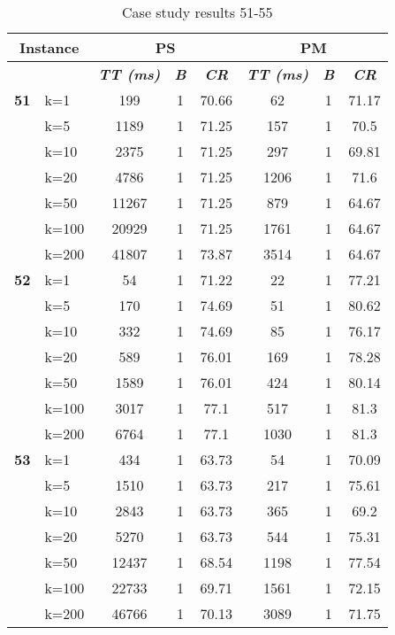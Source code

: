     \begin{table}[htbp]
    \caption{Case study results 51-55}
    \centering
    \begin{tabular}{|l|l|c|c|c|c|c|c|}
    \hline
    \multicolumn{ 2}{|c|}{\textbf{Instance}} & \multicolumn{ 3}{c|}{\textbf{PS}} & \multicolumn{ 3}{c|}{\textbf{PM}} \\ \hline
    \multicolumn{ 2}{|l|}{} & \textbf{\textit{TT (ms)}} & \textbf{\textit{B}} & \textbf{\textit{CR}} & \textbf{\textit{TT (ms)}} & \textbf{\textit{B}} & \textbf{\textit{CR}} \\ \hline
    \multicolumn{1}{|r|}{\textbf{51}} & k=1 & 199 & 1 & 70.66 & 62 & 1 & 71.17 \\ 
     & k=5 & 1189 & 1 & 71.25 & 157 & 1 & 70.5 \\ 
     & k=10 & 2375 & 1 & 71.25 & 297 & 1 & 69.81 \\ 
     & k=20 & 4786 & 1 & 71.25 & 1206 & 1 & 71.6 \\ 
     & k=50 & 11267 & 1 & 71.25 & 879 & 1 & 64.67 \\ 
     & k=100 & 20929 & 1 & 71.25 & 1761 & 1 & 64.67 \\ 
     & k=200 & 41807 & 1 & 73.87 & 3514 & 1 & 64.67 \\ \hline
    \multicolumn{1}{|r|}{\textbf{52}} & k=1 & 54 & 1 & 71.22 & 22 & 1 & 77.21 \\ 
     & k=5 & 170 & 1 & 74.69 & 51 & 1 & 80.62 \\ 
     & k=10 & 332 & 1 & 74.69 & 85 & 1 & 76.17 \\ 
     & k=20 & 589 & 1 & 76.01 & 169 & 1 & 78.28 \\ 
     & k=50 & 1589 & 1 & 76.01 & 424 & 1 & 80.14 \\ 
     & k=100 & 3017 & 1 & 77.1 & 517 & 1 & 81.3 \\ 
     & k=200 & 6764 & 1 & 77.1 & 1030 & 1 & 81.3 \\ \hline
    \multicolumn{1}{|r|}{\textbf{53}} & k=1 & 434 & 1 & 63.73 & 54 & 1 & 70.09 \\ 
     & k=5 & 1510 & 1 & 63.73 & 217 & 1 & 75.61 \\ 
     & k=10 & 2843 & 1 & 63.73 & 365 & 1 & 69.2 \\ 
     & k=20 & 5270 & 1 & 63.73 & 544 & 1 & 75.31 \\ 
     & k=50 & 12437 & 1 & 68.54 & 1198 & 1 & 77.54 \\ 
     & k=100 & 22733 & 1 & 69.71 & 1561 & 1 & 72.15 \\ 
     & k=200 & 46766 & 1 & 70.13 & 3089 & 1 & 71.75 \\ \hline

\end{tabular}
\end{table}
